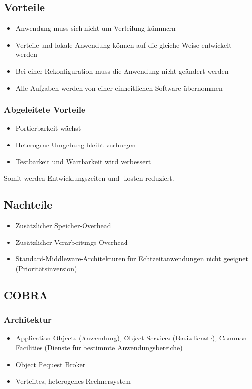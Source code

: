 \subsection{Vorteile}
\begin{itemize}
	\item Anwendung muss sich nicht um Verteilung kümmern
	\item Verteile und lokale Anwendung können auf die gleiche Weise entwickelt werden
	\item Bei einer Rekonfiguration muss die Anwendung nicht geändert werden
	\item Alle Aufgaben werden von einer einheitlichen Software übernommen
\end{itemize}

\subsubsection{Abgeleitete Vorteile}
\begin{itemize}
	\item Portierbarkeit wächst
	\item Heterogene Umgebung bleibt verborgen
	\item Testbarkeit und Wartbarkeit wird verbessert
\end{itemize}
Somit werden Entwicklungszeiten und -kosten reduziert.

\subsection{Nachteile}
\begin{itemize}
	\item Zusätzlicher Speicher-Overhead
	\item Zusätzlicher Verarbeitungs-Overhead
	\item Standard-Middleware-Architekturen für Echtzeitanwendungen nicht geeignet (Prioritätsinversion)
\end{itemize}


\subsection{COBRA}

\subsubsection{Architektur}
\begin{itemize}
	\item Application Objects (Anwendung), Object Services (Basisdienste), Common Facilities (Dienste für bestimmte Anwendungsbereiche)
	\item Object Request Broker
	\item Verteiltes, heterogenes Rechnersystem
\end{itemize}

